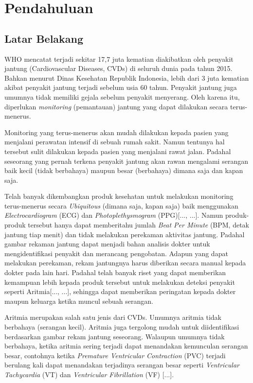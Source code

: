 \chapter{Pendahuluan}
\section{Latar Belakang}

WHO mencatat terjadi sekitar 17,7 juta kematian diakibatkan oleh penyakit jantung (Cardiovascular Diseases, CVDs) di seluruh dunia pada tahun 2015\cite{who2015facts}. Bahkan menurut Dinas Kesehatan Republik Indonesia, lebih dari 3 juta kematian akibat penyakit jantung terjadi sebelum usia 60 tahun\cite{depkes2014}. Penyakit jantung juga umumnya tidak memiliki gejala sebelum penyakit menyerang\cite{who2015facts}. Oleh karena itu, diperlukan \textit{monitoring} (pemantauan) jantung yang dapat dilakukan secara terus-menerus. 

Monitoring yang terus-menerus akan mudah dilakukan kepada pasien yang menjalani perawatan intensif di sebuah rumah sakit. Namun tentunya hal tersebut sulit dilakukan kepada pasien yang menjalani rawat jalan. Padahal seseorang yang pernah terkena penyakit jantung akan rawan mengalami serangan baik kecil (tidak berbahaya) maupun besar (berbahaya) dimana saja dan kapan saja.

Telah banyak dikembangkan produk kesehatan untuk melakukan monitoring terus-menerus secara \textit{Ubiquitous} (dimana saja, kapan saja) baik menggunakan \textit{Electrocardiogram} (ECG) dan \textit{Photoplethysmogram} (PPG)[..., ...]. Namun produk-produk tersebut hanya dapat memberitahu jumlah \textit{Beat Per Minute} (BPM, detak jantung tiap menit) dan tidak melakukan perekaman aktivitas jantung. Padahal gambar rekaman jantung dapat menjadi bahan analisis dokter untuk mengidentifikasi penyakit dan merancang pengobatan. Adapun yang dapat melakukan perekaman, rekam jantungnya harus diberikan secara manual kepada dokter pada lain hari. Padahal telah banyak riset yang dapat memberikan kemampuan lebih kepada produk tersebut untuk melakukan deteksi penyakit seperti Aritmia[..., ...], sehingga dapat memberikan peringatan kepada dokter maupun keluarga ketika muncul sebuah serangan.

Aritmia merupakan salah satu jenis dari CVDs. Umumnya aritmia tidak berbahaya (serangan kecil). Aritmia juga tergolong mudah untuk diidentifikasi berdasarkan gambar rekam jantung seseorang. Walaupun umumnya tidak berbahaya, ketika aritmia sering terjadi dapat menandakan kemunculan serangan besar, contohnya ketika \textit{Premature Ventricular Contraction} (PVC) terjadi berulang kali dapat menandakan terjadinya serangan besar seperti \textit{Ventricular Tachycardia} (VT) dan \textit{Ventricular Fibrillation} (VF) [...]. 

